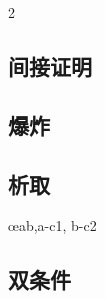 \begin{multicols}{2}
\subsection*{间接证明}

\begin{fitchproof}
\open
	\AS
\close
{}
\end{fitchproof}


\subsection*{爆炸}

\begin{fitchproof}
\end{fitchproof}

\subsection*{析取}

\begin{fitchproof}
\end{fitchproof}
\begin{fitchproof}
\end{fitchproof}
\begin{fitchproof}
	\open
		\AS
	\close
	\open
		\AS
	\close
	 \oe{ab,a-c1, b-c2}
\end{fitchproof}

\subsection*{双条件}

\begin{fitchproof}
	\open
		 \AS
	\close
	\open
		\AS
	\close
\end{fitchproof}
\begin{fitchproof}
	 
\end{fitchproof}
\begin{fitchproof}
	 
\end{fitchproof}

\end{multicols}


